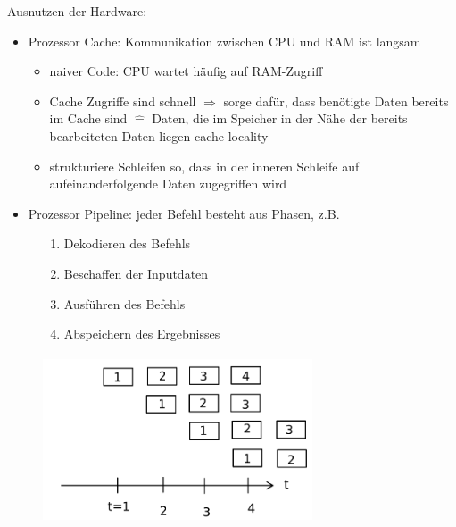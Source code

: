 \documentclass[11pt, fleqn]{scrreprt}
\begin{document}
\begin{itemize}
        Ausnutzen der Hardware:
        \begin{itemize}
            \item Prozessor Cache: Kommunikation zwischen CPU und RAM ist langsam
            \begin{itemize}[label={$\Rightarrow$}]
                \item naiver Code: CPU wartet häufig auf RAM-Zugriff
                \item Cache Zugriffe sind schnell  $\Rightarrow$ sorge dafür, dass benötigte Daten bereits im Cache sind $\widehat{=}$ Daten, die im Speicher in der Nähe der bereits bearbeiteten Daten liegen \glqq cache locality\grqq
                \item strukturiere Schleifen so, dass in der inneren Schleife auf aufeinanderfolgende Daten zugegriffen wird
            \end{itemize}
            \item Prozessor Pipeline: jeder Befehl besteht aus Phasen, z.B.
        \end{itemize}
    \end{itemize}
    \begin{figure}[htbp]
        \begin{minipage}[t]{7cm}
            \vspace*{-2cm}
            \begin{enumerate}
                \item Dekodieren des Befehls
                \item Beschaffen der Inputdaten
                \item Ausführen des Befehls
                \item Abspeichern des Ergebnisses
            \end{enumerate}
        \end{minipage}
        \begin{minipage}{6cm}
        \includegraphics[width=8cm,height=5cm,keepaspectratio]{./Pictures/Pipeline.png}
        \end{minipage}
    \end{figure}
\end{document}
